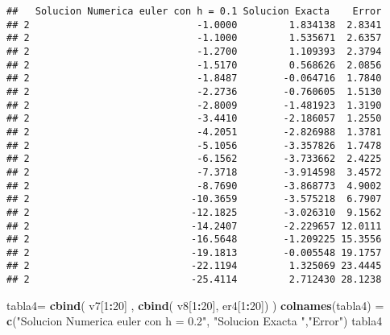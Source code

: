 \documentclass[]{article}
\newenvironment{Shaded}{\begin{snugshade}}{\end{snugshade}}
\newcommand{\KeywordTok}[1]{\textcolor[rgb]{0.13,0.29,0.53}{\textbf{#1}}}
\newcommand{\DecValTok}[1]{\textcolor[rgb]{0.00,0.00,0.81}{#1}}
\newcommand{\StringTok}[1]{\textcolor[rgb]{0.31,0.60,0.02}{#1}}
\newcommand{\OperatorTok}[1]{\textcolor[rgb]{0.81,0.36,0.00}{\textbf{#1}}}
\newcommand{\NormalTok}[1]{#1}
\begin{document}
\begin{verbatim}
##   Solucion Numerica euler con h = 0.1 Solucion Exacta    Error
## 2                             -1.0000         1.834138  2.8341
## 2                             -1.1000         1.535671  2.6357
## 2                             -1.2700         1.109393  2.3794
## 2                             -1.5170         0.568626  2.0856
## 2                             -1.8487        -0.064716  1.7840
## 2                             -2.2736        -0.760605  1.5130
## 2                             -2.8009        -1.481923  1.3190
## 2                             -3.4410        -2.186057  1.2550
## 2                             -4.2051        -2.826988  1.3781
## 2                             -5.1056        -3.357826  1.7478
## 2                             -6.1562        -3.733662  2.4225
## 2                             -7.3718        -3.914598  3.4572
## 2                             -8.7690        -3.868773  4.9002
## 2                            -10.3659        -3.575218  6.7907
## 2                            -12.1825        -3.026310  9.1562
## 2                            -14.2407        -2.229657 12.0111
## 2                            -16.5648        -1.209225 15.3556
## 2                            -19.1813        -0.005548 19.1757
## 2                            -22.1194         1.325069 23.4445
## 2                            -25.4114         2.712430 28.1238
\end{verbatim}

\begin{Shaded}
\begin{Highlighting}[]
\NormalTok{tabla4=}\StringTok{ }\KeywordTok{cbind}\NormalTok{( v7[}\DecValTok{1}\OperatorTok{:}\DecValTok{20}\NormalTok{] , }\KeywordTok{cbind}\NormalTok{( v8[}\DecValTok{1}\OperatorTok{:}\DecValTok{20}\NormalTok{], er4[}\DecValTok{1}\OperatorTok{:}\DecValTok{20}\NormalTok{]) )}
\KeywordTok{colnames}\NormalTok{(tabla4) =}\StringTok{ }\KeywordTok{c}\NormalTok{(}\StringTok{"Solucion Numerica euler con h = 0.2"}\NormalTok{, }\StringTok{"Solucion Exacta "}\NormalTok{,}\StringTok{"Error"}\NormalTok{)}
\NormalTok{tabla4}
\end{Highlighting}
\end{Shaded}
\end{document}
